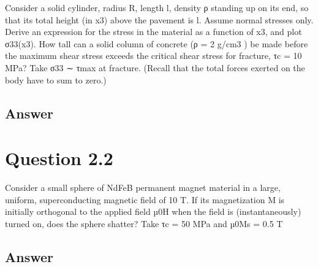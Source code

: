 \documentclass[
	12pt, %
]{fphw}
\begin{document}
\begin{problem}
Consider a solid cylinder, radius R, length l, density ρ standing up
on its end, so that its total height (in x3) above the pavement is l.
Assume normal stresses only. Derive an expression for the stress in
the material as a function of x3, and plot σ33(x3). How tall can a solid
column of concrete (ρ = 2 g/cm3
) be made before the maximum shear
stress exceeds the critical shear stress for fracture, τc = 10 MPa? Take
σ33 ∼ τmax at fracture. (Recall that the total forces exerted on the
body have to sum to zero.)
\end{problem}


\subsection*{Answer}

\begin{enumerate}

\end{enumerate}


\section*{Question 2.2}

\begin{problem}
Consider a small sphere of NdFeB permanent magnet material in a
large, uniform, superconducting magnetic field of 10 T. If its magnetization M is initially orthogonal to the applied field µ0H when the
field is (instantaneously) turned on, does the sphere shatter? Take
τc = 50 MPa and µ0Ms = 0.5 T
\end{problem}


\subsection*{Answer}

\begin{enumerate}

\end{enumerate}

\end{document}
